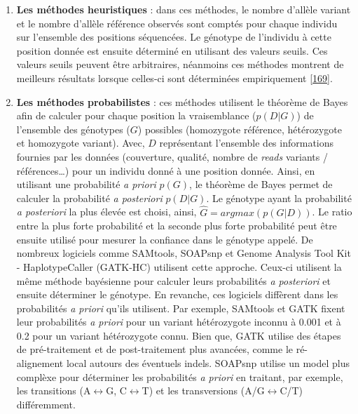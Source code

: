 \documentclass[12pt,a4paper,twoside]{ugathesis}
\theoremstyle{definition}
\theoremstyle{definition}
\theoremstyle{definition}
\theoremstyle{remark}
\begin{document}
\begin{enumerate}
\def\labelenumi{\arabic{enumi}.}
\item
  \textbf{Les méthodes heuristiques} : dans ces méthodes, le nombre
  d'allèle variant et le nombre d'allèle référence observés sont comptés
  pour chaque individu sur l'ensemble des positions séquencées. Le
  génotype de l'individu à cette position donnée est ensuite déterminé
  en utilisant des valeurs seuils. Ces valeurs seuils peuvent être
  arbitraires, néanmoins ces méthodes montrent de meilleurs résultats
  lorsque celles-ci sont déterminées empiriquement
  {[}\protect\hyperlink{ref-Hedges2009}{169}{]}.
\item
  \textbf{Les méthodes probabilistes} : ces méthodes utilisent le
  théorème de Bayes afin de calculer pour chaque position la
  vraisemblance (\(p(D|G)\)) de l'ensemble des génotypes (\(G\))
  possibles (homozygote référence, hétérozygote et homozygote variant).
  Avec, \(D\) représentant l'ensemble des informations fournies par les
  données (couverture, qualité, nombre de \emph{reads} variants /
  références\ldots{}) pour un individu donné à une position donnée.
  Ainsi, en utilisant une probabilité \emph{a priori} \(p(G)\), le
  théorème de Bayes permet de calculer la probabilité \emph{a
  posteriori} \(p(D|G)\). Le génotype ayant la probabilité \emph{a
  posteriori} la plus élevée est choisi, ainsi,
  \(\hat{G} = argmax(p(G|D))\). Le ratio entre la plus forte probabilité
  et la seconde plus forte probabilité peut être ensuite utilisé pour
  mesurer la confiance dans le génotype appelé. De nombreux logiciels
  comme SAMtools, SOAPsnp et Genome Analysis Tool Kit - HaplotypeCaller
  (GATK-HC) utilisent cette approche. Ceux-ci utilisent la même méthode
  bayésienne pour calculer leurs probabilités \emph{a posteriori} et
  ensuite déterminer le génotype. En revanche, ces logiciels diffèrent
  dans les probabilités \emph{a priori} qu'ils utilisent. Par exemple,
  SAMtools et GATK fixent leur probabilités \emph{a priori} pour un
  variant hétérozygote inconnu à 0.001 et à 0.2 pour un variant
  hétérozygote connu. Bien que, GATK utilise des étapes de
  pré-traitement et de post-traitement plus avancées, comme le
  ré-alignement local autours des éventuels indels. SOAPsnp utilise un
  model plus complèxe pour déterminer les probabilités \emph{a priori}
  en traitant, par exemple, les transitions (A\(\leftrightarrow\)G,
  C\(\leftrightarrow\)T) et les transversions
  (A/G\(\leftrightarrow\)C/T) différemment.
\end{enumerate}
\end{document}
